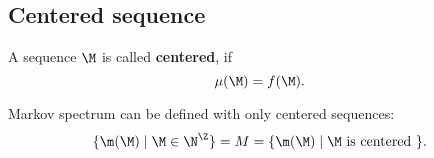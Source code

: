 \subsection{Centered sequence}

\begin{definition}
	A sequence $\M$ is called \textbf{centered}, if
	\begin{equation}\label{centered}
		\mu(\M) = f(\M).
	\end{equation}
\end{definition}

\begin{proposition}
	Markov spectrum can be defined with only centered sequences:
	\begin{equation*}
		\{ \m(\M) \mid \M \in \N^\Z \} =
		M =
		\{ \m(\M) \mid \M \text{ is centered } \}.
	\end{equation*}
\end{proposition}

